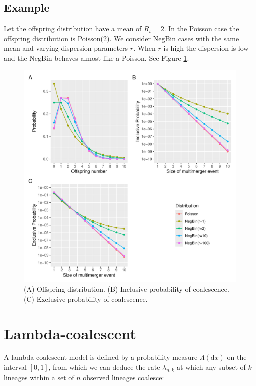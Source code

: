 \documentclass{article}
\begin{document}
\subsection{Example}

Let the offspring distribution have a mean of $R_t=2$. In the Poisson case the offspring distribution is Poisson(2). We consider NegBin cases with the same mean and varying dispersion parameters $r$. When $r$ is high the dispersion is low and the NegBin behaves almost like a Poisson.
See Figure \ref{fig:probs}.

\begin{figure}[t!]
\begin{center}
\includegraphics[width=15cm]{../run/figure.pdf}
\end{center}
\caption{(A) Offspring distribution. (B) Inclusive probability of coalescence. (C) Exclusive probability of coalescence.
\label{fig:probs}}
\end{figure}

\section{Lambda-coalescent}

A lambda-coalescent model is defined by a probability measure 
$\Lambda(\mathrm{d} x)$ on the interval $[0,1]$, from which we can deduce
the rate $\lambda_{n,k}$ at which any subset of $k$ lineages within a set of $n$ observed lineages 
coalesce:
\end{document}
